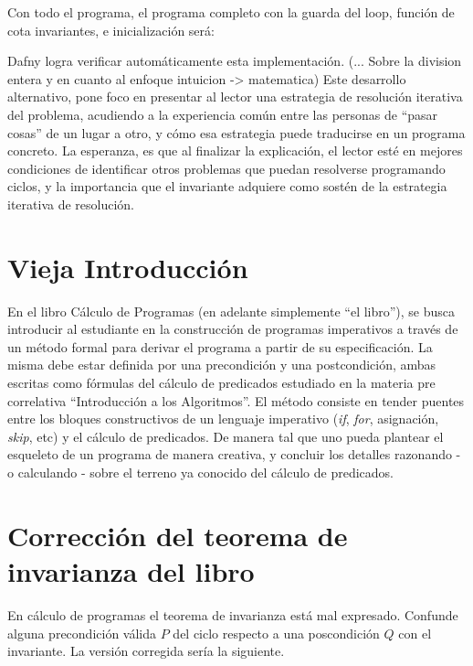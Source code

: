 \documentclass[12pt, a4paper, openany, fleqn]{book}
\begin{document}
    Con todo el programa, el programa completo con la guarda del loop, función de cota invariantes, e inicialización será:


    Dafny logra verificar automáticamente esta implementación.
    (... Sobre la division entera y en cuanto al enfoque intuicion -> matematica)
    Este desarrollo alternativo, pone foco en presentar al lector una estrategia de resolución iterativa del problema, acudiendo a la experiencia común entre las personas de ``pasar cosas'' de un lugar a otro, y cómo esa estrategia puede traducirse en un programa concreto.
    La esperanza, es que al finalizar la explicación, el lector esté en mejores condiciones de identificar otros problemas que puedan resolverse programando ciclos, y la importancia que el invariante adquiere como sostén de la estrategia iterativa de resolución.

    \section{Vieja Introducción}
    En el libro Cálculo de Programas (en adelante simplemente ``el libro''), se busca introducir al estudiante en la construcción de programas imperativos a través de un método formal para derivar el programa a partir de su especificación. La misma debe estar definida por una precondición y una postcondición, ambas escritas como fórmulas del cálculo de predicados estudiado en la materia pre correlativa ``Introducción a los Algoritmos''. El método consiste en tender puentes entre los bloques constructivos de un lenguaje imperativo (\textit{if}, \textit{for}, asignación, \textit{skip}, etc) y el cálculo de predicados. De manera tal que uno pueda plantear el esqueleto de un programa de manera creativa, y concluir los detalles razonando - o calculando - sobre el terreno ya conocido del cálculo de predicados.

    \section{Corrección del teorema de invarianza del libro}
    En cálculo de programas el teorema de invarianza está mal expresado. Confunde alguna precondición válida $P$ del ciclo respecto a una poscondición $Q$ con el invariante.
    La versión corregida sería la siguiente.
\end{document}
